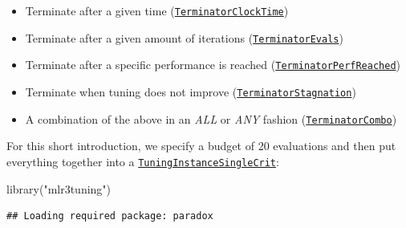 \documentclass[
]{scrbook}
\newenvironment{Shaded}{\begin{snugshade}}{\end{snugshade}}
\newcommand{\AttributeTok}[1]{\textcolor[rgb]{0.77,0.63,0.00}{#1}}
\newcommand{\DecValTok}[1]{\textcolor[rgb]{0.00,0.00,0.81}{#1}}
\newcommand{\FunctionTok}[1]{\textcolor[rgb]{0.00,0.00,0.00}{#1}}
\newcommand{\NormalTok}[1]{#1}
\newcommand{\OtherTok}[1]{\textcolor[rgb]{0.56,0.35,0.01}{#1}}
\newcommand{\SpecialCharTok}[1]{\textcolor[rgb]{0.00,0.00,0.00}{#1}}
\newcommand{\StringTok}[1]{\textcolor[rgb]{0.31,0.60,0.02}{#1}}
\providecommand{\tightlist}{%
  \setlength{\itemsep}{0pt}\setlength{\parskip}{0pt}}
\renewenvironment{Shaded} {\begin{snugshade}\small} {\end{snugshade}}
\begin{document}
\begin{itemize}
\tightlist
\item
  Terminate after a given time (\href{https://bbotk.mlr-org.com/reference/mlr_terminators_clock_time.html}{\texttt{TerminatorClockTime}})
\item
  Terminate after a given amount of iterations (\href{https://bbotk.mlr-org.com/reference/mlr_terminators_evals.html}{\texttt{TerminatorEvals}})
\item
  Terminate after a specific performance is reached (\href{https://bbotk.mlr-org.com/reference/mlr_terminators_perf_reached.html}{\texttt{TerminatorPerfReached}})
\item
  Terminate when tuning does not improve (\href{https://bbotk.mlr-org.com/reference/mlr_terminators_stagnation.html}{\texttt{TerminatorStagnation}})
\item
  A combination of the above in an \emph{ALL} or \emph{ANY} fashion (\href{https://bbotk.mlr-org.com/reference/mlr_terminators_combo.html}{\texttt{TerminatorCombo}})
\end{itemize}

For this short introduction, we specify a budget of 20 evaluations and then put everything together into a \href{https://mlr3tuning.mlr-org.com/reference/TuningInstanceSingleCrit.html}{\texttt{TuningInstanceSingleCrit}}:

\begin{Shaded}
\begin{Highlighting}[]
\FunctionTok{library}\NormalTok{(}\StringTok{"mlr3tuning"}\NormalTok{)}
\end{Highlighting}
\end{Shaded}

\begin{verbatim}
## Loading required package: paradox
\end{verbatim}

\begin{Shaded}
\end{Shaded}
\end{document}
